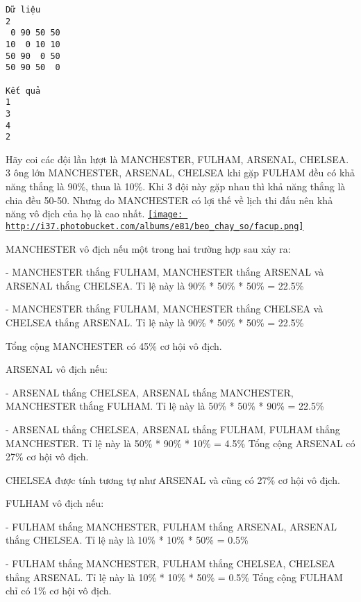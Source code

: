 \begin{verbatim}
Dữ liệu
2
 0 90 50 50
10  0 10 10
50 90  0 50
50 90 50  0

Kết quả
1
3
4
2
\end{verbatim}
Hãy coi các đội lần lượt là MANCHESTER, FULHAM, ARSENAL, CHELSEA. 3 ông lớn MANCHESTER, ARSENAL, CHELSEA khi gặp FULHAM đều có khả năng thắng là 90\%, thua là 10\%. Khi 3 đội này gặp nhau thì khả năng thắng là chia đều 50-50. Nhưng do MANCHESTER có lợi thế về lịch thi đấu nên khả năng vô địch của họ là cao nhất.  \href{http://s37.photobucket.com/albums/e81/beo_chay_so/?action=view¤t=facup.png}{
\texttt{[image: http://i37.photobucket.com/albums/e81/beo\_chay\_so/facup.png]}}

   MANCHESTER vô địch nếu một trong hai trường hợp sau xảy ra:  

   - MANCHESTER thắng FULHAM, MANCHESTER thắng ARSENAL và ARSENAL thắng CHELSEA. Tỉ lệ này là 90\% * 50\% * 50\% = 22.5\%  

   - MANCHESTER thắng FULHAM, MANCHESTER thắng CHELSEA và CHELSEA thắng ARSENAL. Tỉ lệ này là 90\% * 50\% * 50\% = 22.5\%  

   Tổng cộng MANCHESTER có 45\% cơ hội vô địch.  

   ARSENAL vô địch nếu:  

   - ARSENAL thắng CHELSEA, ARSENAL thắng MANCHESTER, MANCHESTER thắng FULHAM. Tỉ lệ này là 50\% * 50\% * 90\% = 22.5\%  

   - ARSENAL thắng CHELSEA, ARSENAL thắng FULHAM, FULHAM thắng MANCHESTER. Tỉ lệ này là 50\% * 90\% * 10\% = 4.5\% Tổng cộng ARSENAL có 27\% cơ hội vô địch.  

   CHELSEA được tính tương tự như ARSENAL và cũng có 27\% cơ hội vô địch.  

   FULHAM vô địch nếu:  

   - FULHAM thắng MANCHESTER, FULHAM thắng ARSENAL, ARSENAL thắng CHELSEA. Tỉ lệ này là 10\% * 10\% * 50\% = 0.5\%  

   - FULHAM thắng MANCHESTER, FULHAM thắng CHELSEA, CHELSEA thắng ARSENAL. Tỉ lệ này là 10\% * 10\% * 50\% = 0.5\% Tổng cộng FULHAM chỉ có 1\% cơ hội vô địch.
